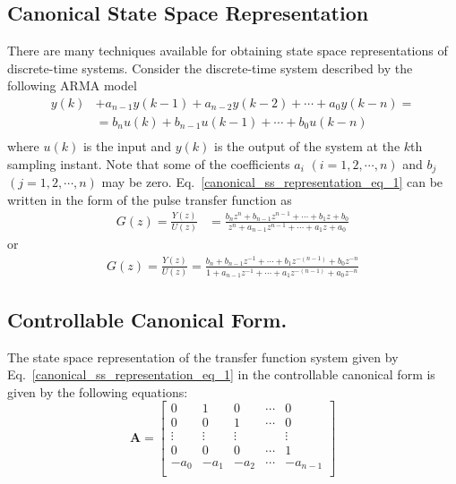 \documentclass[12pt,a4paper,oneside]{book}
\begin{document}
\begin{onehalfspace}
\section{Canonical State Space Representation}
\begin{mybox}
There are many techniques available for obtaining state space representations 
of discrete-time systems. Consider the discrete-time system described by the 
following ARMA model
\begin{equation}\label{canonical_ss_representation_eq_1}
	\begin{aligned}
		y(k) &+ a_{n-1}y(k-1)+a_{n-2}y(k-2)+\cdots+a_0y(k-n) = \\[6pt]
		&= b_nu(k)+b_{n-1}u(k-1)+\cdots+b_0u(k-n) \\
	\end{aligned}
\end{equation}
where $u(k)$ is the input and $y(k)$ is the output of the system at the $k$th sampling instant. Note that some of the coefficients $a_i$ $(i=1,2,\cdots,n)$ and $b_j$ $(j=1,2,\cdots,n)$ may be zero. Eq.~\ref{canonical_ss_representation_eq_1} can be written in the form of the pulse transfer function as
\begin{equation}\label{canonical_ss_representation_eq_2}
	\begin{aligned}
		G(z)=\frac{Y(z)}{U(z)} &= \frac{b_nz^n+b_{n-1}z^{n-1}+ \cdots +b_1z+b_0}{z^n+a_{n-1}z^{n-1}+ \cdots +a_1z+a_0}
	\end{aligned}
\end{equation}
or 
\begin{equation}\label{canonical_ss_representation_eq_3}
	\begin{aligned}
		G(z)=\frac{Y(z)}{U(z)} = \frac{b_n +b_{n-1}z^{-1}+ \cdots +b_1 z^{-(n-1)} + b_0 z^{-n}}{1 + a_{n-1}z^{-1}+ \cdots +a_1 z^{-(n-1)}+a_0 z^{-n}}
	\end{aligned}
\end{equation}
\end{mybox}
\subsection{Controllable Canonical Form.} \begin{mybox} The state space 
representation of the 
transfer function system given by Eq.~\eqref{canonical_ss_representation_eq_1} 
in the controllable canonical 
form is given by the following equations:
\begin{equation}\label{ccanonical_form_eq1}
	\mathbf{A} = \left[ \begin{matrix}
		0 & 1 & 0 & \cdots & 0 \\
		0 & 0 & 1 & \cdots & 0 \\
		\vdots & \vdots & \vdots &  & \vdots \\
		0 & 0 & 0 & \cdots & 1 \\
		-a_0 & -a_1 & -a_2 & \cdots & -a_{n-1} \\
	\end{matrix}\right] 
\end{equation}


\end{mybox}
\end{onehalfspace}
\end{document}
